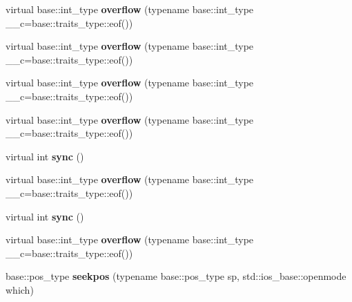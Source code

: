 \begin{DoxyCompactItemize}
\mbox{\label{structtestbuf_a1d33d01e5a3f18a1fa4407c67eb87f52}} 
virtual base\+::int\+\_\+type {\bfseries overflow} (typename base\+::int\+\_\+type \+\_\+\+\_\+c=base\+::traits\+\_\+type\+::eof())
\item 
\mbox{\label{structtestbuf_a1d33d01e5a3f18a1fa4407c67eb87f52}} 
virtual base\+::int\+\_\+type {\bfseries overflow} (typename base\+::int\+\_\+type \+\_\+\+\_\+c=base\+::traits\+\_\+type\+::eof())
\item 
\mbox{\label{structtestbuf_a1d33d01e5a3f18a1fa4407c67eb87f52}} 
virtual base\+::int\+\_\+type {\bfseries overflow} (typename base\+::int\+\_\+type \+\_\+\+\_\+c=base\+::traits\+\_\+type\+::eof())
\item 
\mbox{\label{structtestbuf_a1d33d01e5a3f18a1fa4407c67eb87f52}} 
virtual base\+::int\+\_\+type {\bfseries overflow} (typename base\+::int\+\_\+type \+\_\+\+\_\+c=base\+::traits\+\_\+type\+::eof())
\item 
\mbox{\label{structtestbuf_a0b5673fd18dc4f85aff8adbc8142ec79}} 
virtual int {\bfseries sync} ()
\item 
\mbox{\label{structtestbuf_a1d33d01e5a3f18a1fa4407c67eb87f52}} 
virtual base\+::int\+\_\+type {\bfseries overflow} (typename base\+::int\+\_\+type \+\_\+\+\_\+c=base\+::traits\+\_\+type\+::eof())
\item 
\mbox{\label{structtestbuf_a0b5673fd18dc4f85aff8adbc8142ec79}} 
virtual int {\bfseries sync} ()
\item 
\mbox{\label{structtestbuf_a1d33d01e5a3f18a1fa4407c67eb87f52}} 
virtual base\+::int\+\_\+type {\bfseries overflow} (typename base\+::int\+\_\+type \+\_\+\+\_\+c=base\+::traits\+\_\+type\+::eof())
\item 
\mbox{\label{structtestbuf_aadb0268eede3e5dd19ebcb1810966950}} 
base\+::pos\+\_\+type {\bfseries seekpos} (typename base\+::pos\+\_\+type sp, std\+::ios\+\_\+base\+::openmode which)
\item 
\mbox{\label{structtestbuf_a0bf3839a4f8c118fc41e0514a7f79a1e}} 

\end{DoxyCompactItemize}

